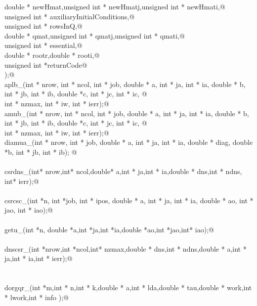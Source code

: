 \documentclass[12pt]{article}
\begin{document}
\begin{flushleft}
\begin{minipage}{\linewidth}
\begin{list}{}{}
\mbox{}\verb@    double * newHmat,unsigned int * newHmatj,unsigned int * newHmati,@\\
\mbox{}\verb@    unsigned int *  auxiliaryInitialConditions,@\\
\mbox{}\verb@    unsigned int *  rowsInQ,@\\
\mbox{}\verb@    double * qmat,unsigned int * qmatj,unsigned int * qmati,@\\
\mbox{}\verb@    unsigned int * essential,@\\
\mbox{}\verb@    double * rootr,double * rooti,@\\
\mbox{}\verb@    unsigned int *returnCode@\\
\mbox{}\verb@                );@\\
\mbox{}\verb@int aplb_(int * nrow, int * ncol, int * job, double * a, int * ja, int * ia, double * b, int * jb, int * ib, double *c, int * jc, int * ic, @\\
\mbox{}\verb@        int * nzmax, int * iw, int * ierr);@\\
\mbox{}\verb@int amub_(int * nrow, int * ncol, int * job, double * a, int * ja, int * ia, double * b, int * jb, int * ib, double *c, int * jc, int * ic, @\\
\mbox{}\verb@        int * nzmax, int * iw, int * ierr);@\\
\mbox{}\verb@int diamua_(int * nrow,  int * job, double * a, int * ja, int * ia, double * diag, double *b, int * jb, int * ib); @\\
\mbox{}\verb@@\\
\mbox{}\verb@int csrdns_(int* nrow,int* ncol,double* a,int * ja,int * ia,double * dns,int * ndns, int* ierr);@\\
\mbox{}\verb@@\\
\mbox{}\verb@int csrcsc_(int *n, int *job, int * ipos, double * a, int * ja, int * ia, double * ao, int * jao, int * iao);@\\
\mbox{}\verb@@\\
\mbox{}\verb@int getu_(int *n, double *a,int *ja,int *ia,double *ao,int *jao,int* iao);@\\
\mbox{}\verb@@\\
\mbox{}\verb@int dnscsr_(int *nrow,int *ncol,int* nzmax,double * dns,int * ndns,double * a,int * ja,int * ia,int * ierr);@\\
\mbox{}\verb@@\\
\mbox{}\verb@@\\
\mbox{}\verb@void dorgqr_(int *m,int * n,int * k,double * a,int * lda,double * tau,double * work,int * lwork,int * info );@\\

\end{list}
\end{minipage}
\end{flushleft}
\end{document}
